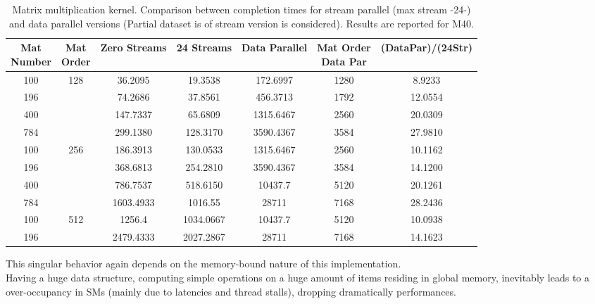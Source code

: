\begin{itemize}
\begin{table}[!h]
\begin{tabular}{ | c  c || c | c  || c | c | c  || }
		\makecell{	Mat\\ Number}&	\makecell{Mat\\ Order}&	Zero Streams&	24 Streams&	Data Parallel& \makecell{Mat Order\\Data Par}&	(DataPar)/(24Str)\\
			\hline	\hline	
			100&	\multirow{3}{*}{128}&	36.2095&	19.3538&	172.6997&	1280&	8.9233\\
			196	& &	74.2686&	37.8561&	456.3713&	1792&	12.0554\\
			400	& &	147.7337&	65.6809&	1315.6467&	2560&	20.0309\\
			784	& &	299.1380&	128.3170&	3590.4367&	3584&	27.9810\\
			\hline
			100&	\multirow{3}{*}{256}& 186.3913&	130.0533& 1315.6467&	2560& 10.1162\\
			196& &	368.6813&	254.2810&	3590.4367&	3584&	14.1200\\
			400	& &	786.7537&	518.6150&	10437.7&	5120&	20.1261\\
			784	& &	1603.4933&	1016.55&	28711&	7168&	28.2436\\
			\hline
			100&	\multirow{1}{*}{512}&	1256.4&	1034.0667&	10437.7&	5120&	10.0938\\
			196& &	2479.4333&	2027.2867&	28711&	7168&	14.1623\\
		\hline
		\end{tabular}
		\caption{Matrix multiplication kernel. Comparison between completion times for stream parallel (max stream -24-) and data parallel versions (Partial dataset is of stream version is considered). Results are reported for M40.}	
		\label{tab:matdataparVSsmM40}		
	\end{table}
	This singular behavior again depends on the memory-bound nature of this implementation.\\
	Having a huge data structure, computing simple operations on a huge amount of items residing in global memory, inevitably leads to a over-occupancy in SMs (mainly due to latencies and thread stalls), dropping dramatically performances.
	

\end{itemize}
